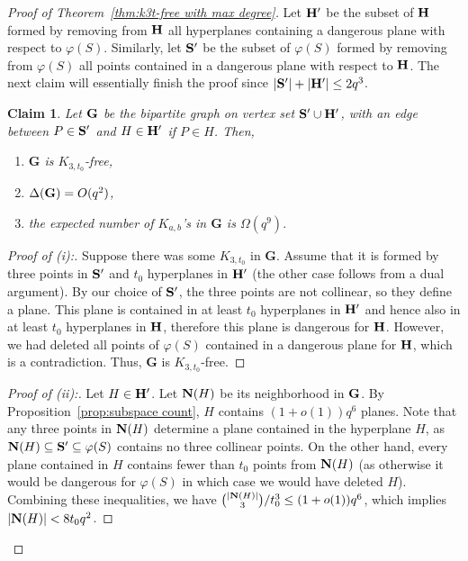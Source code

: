 \documentclass[12pt]{article}
\newtheorem{claim}[theorem]{Claim}
\begin{document}
\begin{proof}[Proof of Theorem~\ref{thm:k3t-free with max degree}]
Let $\bold{H}'$ be the subset of $\bold{H}$ formed by removing from $\bold{H}$ all hyperplanes containing a dangerous plane with respect to $\varphi(S)$. Similarly, let $\bold{S}'$ be the subset of $\varphi(S)$ formed by removing from $\varphi(S)$ all points contained in a dangerous plane with respect to $\bold{H}$. The next claim will essentially finish the proof since $|\bold{S}'|+|\bold{H}'|\leq 2q^3$.

\begin{claim} \label{claim:random incidence graph}
    Let $\bold{G}$ be the bipartite graph on vertex set $\bold{S'}\cup \bold{H'}$, with an edge between $P\in \bold{S}'$ and $H\in \bold{H}'$ if $P \in H$. Then,
    \begin{enumerate}
        \item[(i)] $\textbf{G}$ is $K_{3, t_0}$-free,
        \item[(ii)] $\Delta(\bold{G}) = O( q^2)$, 
        \item[(iii)] the expected number of $K_{a, b}$'s in $\textbf{G}$ is  $\Omega(q^9).$
    \end{enumerate}
\end{claim}
\begin{proof}[Proof of (i):]
    Suppose there was some $K_{3, t_0}$ in $\textbf{G}$. Assume that it is formed by three points in $\bold{S}'$ and $t_0$ hyperplanes in $\bold{H}'$ (the other case follows from a dual argument). By our choice of $\bold{S}'$, the three points are not collinear, so they define a plane. This plane is contained in at least $t_0$ hyperplanes in $\bold{H}'$ and hence also in at least $t_0$ hyperplanes in $\bold{H}$, therefore this plane is dangerous for $\bold{H}$. However, we had deleted all points of $\varphi(S)$ contained in a dangerous plane for $\bold{H}$, which is a contradiction. Thus, $\textbf{G}$ is $K_{3, t_0}$-free.  \end{proof}
    \begin{proof}[Proof of (ii):]Let $H\in \bold{H}'$. Let $\bold{N}(H)$ be its neighborhood in $\bold{G}$. By Proposition~\ref{prop:subspace count}, $H$ contains $(1+o(1))q^6$ planes. Note that any three points in $\bold{N}(H)$ determine a plane contained in the hyperplane $H$, as $\bold{N}(H) \subseteq \bold{S}'\subseteq \varphi(S)$ contains no three collinear points. On the other hand, every plane contained in $H$ contains fewer than $t_0$ points from $\bold{N}(H)$ (as otherwise it would be dangerous for $\varphi(S)$ in which case we would have deleted $H$). Combining these inequalities, we have ${|\bold{N}(H)| \choose 3}/t_0^3\leq (1+o(1))q^6$, which implies  $|\bold{N}(H)|<8t_0q^2$.
    



\end{proof}
\end{proof}
\end{document}
